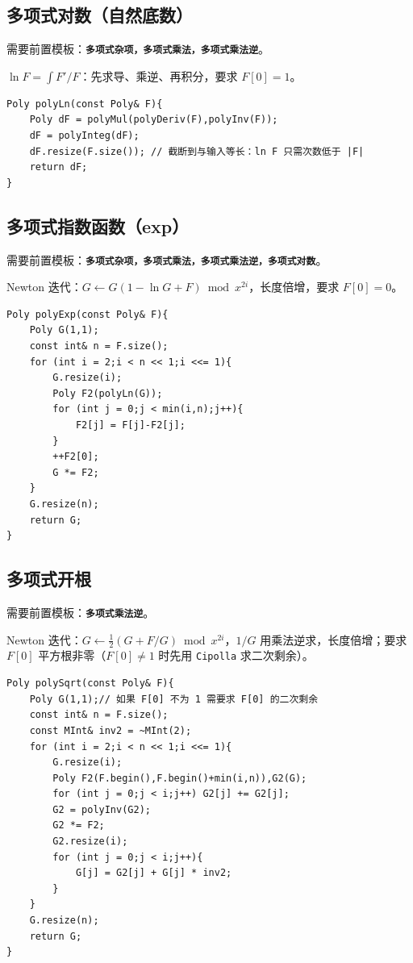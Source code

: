 \subsection{多项式对数（自然底数）}

需要前置模板：\textbf{\texttt{多项式杂项，多项式乘法，多项式乘法逆}}。

$\ln F=\int F'/F$：先求导、乘逆、再积分，要求 $F[0]=1$。

\begin{lstlisting}
Poly polyLn(const Poly& F){
    Poly dF = polyMul(polyDeriv(F),polyInv(F));
    dF = polyInteg(dF);
    dF.resize(F.size()); // 截断到与输入等长：ln F 只需次数低于 |F|
    return dF;
}
\end{lstlisting}

\subsection{多项式指数函数（exp）}

需要前置模板：\textbf{\texttt{多项式杂项，多项式乘法，多项式乘法逆，多项式对数}}。

Newton 迭代：$G\leftarrow G(1-\ln G+F)\bmod x^{2i}$，长度倍增，要求 $F[0]=0$。

\begin{lstlisting}
Poly polyExp(const Poly& F){
    Poly G(1,1);
    const int& n = F.size();
    for (int i = 2;i < n << 1;i <<= 1){
        G.resize(i);
        Poly F2(polyLn(G));
        for (int j = 0;j < min(i,n);j++){
            F2[j] = F[j]-F2[j];
        }
        ++F2[0];
        G *= F2;
    }
    G.resize(n);
    return G;
}
\end{lstlisting}

\subsection{多项式开根}

需要前置模板：\textbf{\texttt{多项式乘法逆}}。

Newton 迭代：$G\leftarrow \frac{1}{2}(G+F/G)\bmod x^{2i}$，$1/G$ 用乘法逆求，长度倍增；要求 $F[0]$ 平方根非零（$F[0]\neq 1$ 时先用 \texttt{Cipolla} 求二次剩余）。

\begin{lstlisting}
Poly polySqrt(const Poly& F){
    Poly G(1,1);// 如果 F[0] 不为 1 需要求 F[0] 的二次剩余
    const int& n = F.size();
    const MInt& inv2 = ~MInt(2);
    for (int i = 2;i < n << 1;i <<= 1){
        G.resize(i);
        Poly F2(F.begin(),F.begin()+min(i,n)),G2(G);
        for (int j = 0;j < i;j++) G2[j] += G2[j];
        G2 = polyInv(G2);
        G2 *= F2;
        G2.resize(i);
        for (int j = 0;j < i;j++){
            G[j] = G2[j] + G[j] * inv2;
        }
    }
    G.resize(n);
    return G;
}
\end{lstlisting}

